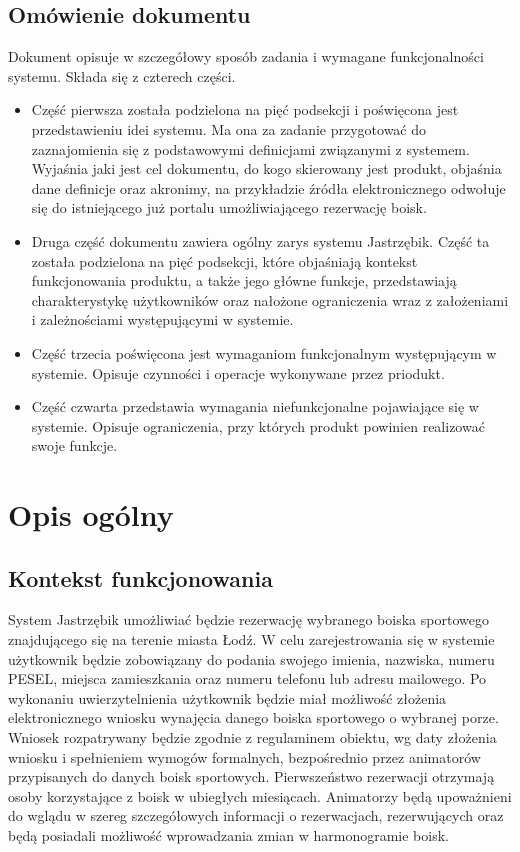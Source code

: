 \documentclass[a4paper,11pt]{article}
\begin{document}
\subsection {Omówienie dokumentu}
Dokument opisuje w szczegółowy sposób zadania i wymagane funkcjonalności systemu. Składa się z czterech części.
\begin{itemize}
	\item Część pierwsza  została podzielona na pięć podsekcji i poświęcona jest przedstawieniu idei systemu. Ma ona za zadanie przygotować do zaznajomienia się z podstawowymi definicjami związanymi z systemem. Wyjaśnia jaki jest cel dokumentu, do kogo skierowany jest produkt, objaśnia dane definicje oraz akronimy, na przykładzie źródła elektronicznego odwołuje się do istniejącego już portalu umożliwiającego rezerwację boisk. 
	\item Druga część dokumentu zawiera ogólny zarys systemu Jastrzębik. Część ta została podzielona na pięć podsekcji, które objaśniają kontekst funkcjonowania produktu, a także jego główne funkcje, przedstawiają charakterystykę użytkowników oraz nałożone ograniczenia wraz z założeniami i zależnościami występującymi w systemie.
	\item Część trzecia poświęcona jest wymaganiom funkcjonalnym występującym w systemie. Opisuje czynności i operacje wykonywane przez priodukt.
	\item Część czwarta przedstawia wymagania niefunkcjonalne pojawiające się w systemie. Opisuje ograniczenia, przy których produkt powinien realizować swoje funkcje.
\end{itemize}

\section {Opis ogólny}

\subsection {Kontekst funkcjonowania}
System Jastrzębik umożliwiać będzie rezerwację wybranego boiska sportowego znajdującego się na terenie miasta Łodź. W celu zarejestrowania się w systemie użytkownik będzie zobowiązany do podania swojego imienia, nazwiska, numeru PESEL, miejsca zamieszkania oraz numeru telefonu lub adresu mailowego. Po wykonaniu uwierzytelnienia użytkownik będzie miał możliwość złożenia elektronicznego wniosku wynajęcia danego boiska sportowego o wybranej porze. Wniosek rozpatrywany będzie zgodnie z regulaminem obiektu, wg daty złożenia wniosku i spełnieniem wymogów formalnych, bezpośrednio przez animatorów przypisanych do danych boisk sportowych. Pierwszeństwo rezerwacji otrzymają osoby korzystające z boisk w ubiegłych miesiącach. Animatorzy będą upoważnieni do wglądu w szereg szczegółowych informacji o rezerwacjach, rezerwujących oraz będą posiadali możliwość wprowadzania zmian w harmonogramie boisk. 
\end{document}
